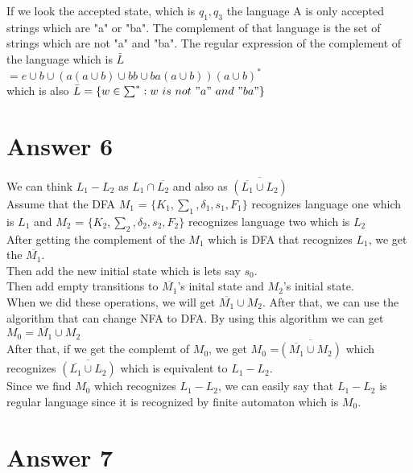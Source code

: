 \documentclass[12pt]{article}
\begin{document}
If we look the accepted state, which is ${q_1,q_3}$ the language A is only accepted strings which are "a" or "ba". The complement of that language is the set of strings which are not "a" and "ba". The regular expression of the complement of the language which is $\bar{L}$ \\
$= e \cup b \cup (a(a \cup b) \cup bb \cup ba(a \cup b))(a \cup b)^*$ \\
which is also $\bar{L} = \{w \in \sum^* : w\  is\  not\  "a"\  and\  "ba" \}$




\section*{Answer 6}

We can think $L_1 - L_2$ as $L_1 \cap \overline{L_2}$ and also as $\overline{(\overline{L_1} \cup L_2)}$ \\



Assume that the DFA $M_1$ = $\{K_1,\sum_1, \delta_1,s_1,F_1\}$ recognizes language one which is $L_1$ and $M_2$ = $\{K_2,\sum_2, \delta_2,s_2,F_2\}$ recognizes language two which is $L_2$ \\

After getting the complement of the $M_1$ which is DFA that recognizes $L_1$, we get the $\overline{M_1}$. \\
Then add the new initial state which is lets say $s_0$. \\
Then add empty transitions to $\overline{M_1}$'s inital state and $M_2$'s initial state. \\
When we did these operations, we will get $\overline{M_1} \cup M_2$.
After that, we can use the algorithm that can change NFA to DFA. By using this algorithm we can get $M_0 = \overline{M_1} \cup M_2$ \\
After that, if we get the complemt of $M_0$, we get  $M_0$ =$\overline{(\overline{M_1} \cup M_2)}$
which recognizes $\overline{(\overline{L_1} \cup L_2)}$ which is equivalent to $L_1 - L_2$. \\
Since we find $M_0$ which recognizes $L_1 - L_2$, we can easily say that $L_1 - L_2$ is regular language since it is recognized by finite automaton which is $M_0$.



\section*{Answer 7}
\end{document}
